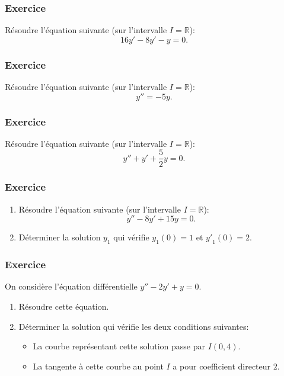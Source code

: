 \documentclass[10pt,a4paper]{article}
\begin{document}
\subsubsection{Exercice}
Résoudre l'équation suivante (sur l'intervalle $I=\mathbb{R}$):
$$16y'-8y'-y=0.$$

\subsubsection{Exercice}
Résoudre l'équation suivante (sur l'intervalle $I=\mathbb{R}$):
$$y''=-5y.$$

\subsubsection{Exercice}
Résoudre l'équation suivante (sur l'intervalle $I=\mathbb{R}$):
$$y''+y'+\dfrac{5}{2}y=0.$$

\subsubsection{Exercice}
\begin{enumerate}
\item
Résoudre l'équation suivante (sur l'intervalle $I=\mathbb{R}$):
$$y''-8y'+15y=0.$$
\item
Déterminer la solution $y_1$ qui vérifie $y_1(0)=1$ et ${y'}_1(0)=2$.
\end{enumerate}

\subsubsection{Exercice}
On considère l'équation différentielle $y''-2y'+y=0$.
\begin{enumerate}
\item
Résoudre cette équation.
\item
Déterminer la solution qui vérifie les deux conditions suivantes:
\begin{itemize}
\item
La courbe représentant cette solution passe par $I(0,4)$.
\item
La tangente à cette courbe au point $I$ a pour coefficient directeur $2$.
\end{itemize}
\end{enumerate}
\end{document}
